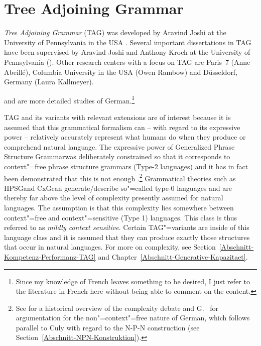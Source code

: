 
\chapter{Tree Adjoining Grammar}
\label{Kapitel-TAG}


\newcommand{\dotted}[0]{\makedash{2pt}}
\newcommand{\g}[1]{{\footnotesize $#1$}}


\emph{Tree Adjoining Grammar} (TAG)
was developed by Aravind Joshi at the University of Pennsylvania in the USA \citep*{JLT75a-u}. 
Several important dissertations in TAG have been supervised by Aravind
Joshi and Anthony Kroch at the University of Pennsylvania (\eg {}).
Other research centers with a focus on TAG are Paris~7 (Anne Abeill\'{e}), Columbia University in the USA
(Owen Rambow) and Düsseldorf, Germany (Laura Kallmeyer).

 and  are more detailed studies of German.\footnote{
	Since my knowledge of French leaves something to be desired, I just refer to the literature in French here without being
	able to comment on the content.%
}

TAG and its variants with relevant extensions are of interest because it is assumed that this grammatical formalism can -- with regard to its
expressive power -- relatively accurately represent what humans do when they produce or comprehend natural language.
The expressive power of Generalized Phrase Structure Grammar\indexgpsg was deliberately constrained so that it corresponds to context"=free
phrase structure grammars (Type-2 languages) and it has in fact been demonstrated that this is not enough \citep{Shieber85a,Culy85a}.\footnote{%
	See \citet{Pullum86a} for a historical overview of the complexity debate and G.\  for argumentation for the non"=context"=free nature
	of German, which follows parallel to  Culy with regard to the N-P-N construction (see Section~\ref{Abschnitt-NPN-Konstruktion}).%
	} Grammatical theories such as HPSG\indexhpsg and CxG\indexcxg can generate/describe so"=called type-0 languages and are thereby far above the level
	of complexity presently assumed for natural languages. 
The assumption is that this complexity lies somewhere between context"=free
and context"=sensitive (Type 1) languages. This class is thus referred to as \emph{mildly context sensitive}.
Certain TAG"=variants are inside of this language class and it is assumed that they can produce exactly those structures that occur in
natural languages. For more on complexity, see Section~\ref{Abschnitt-Kompetenz-Performanz-TAG} and Chapter~\ref{Abschnitt-Generative-Kapazitaet}.

